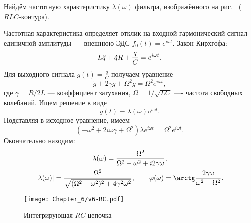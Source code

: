 \begin{lab:example}\label{example:RLC}
Найдём частотную характеристику $\lambda(\omega)$ фильтра,
изображённого на рис.~ ($RLC$-контура).

Частотная характеристика определяет отклик на входной гармонический сигнал
единичной амплитуды~--- внешнюю ЭДС $f_0(t)=e^{i\omega t}$.
Закон Кирхгофа:
\begin{equation}
    \eqmark{RLC}
L\ddot{q} + \dot{q}R+\frac{q}{C}=e^{i\omega t}.
\end{equation}
Для выходного сигнала $g(t)=\frac{q}{C}$ получаем уравнение
\begin{equation*}
\ddot{g}+2\gamma\dot{g}+\Omega^2g=\Omega^2 e^{i\omega t},
\end{equation*}
где $\gamma = R/2L$ --- коэффициент затухания,
$\Omega = 1/\sqrt{LC}$ ---- частота свободных колебаний.
Ищем решение в виде
\begin{equation*}
g(t)=\lambda(\omega)e^{i\omega t}.
\end{equation*}
Подставляя в исходное уравнение, имеем
\begin{equation*}
    (-\omega^2 +2i\omega\gamma + \Omega^2) \lambda e^{i\omega t}=\Omega^2 e^{i\omega t}.
\end{equation*}
Окончательно находим:
\begin{equation}
    \eqmark{RLC-lambda}
\begin{gathered}
\lambda(\omega)=\frac{\Omega^2}{\Omega^2-\omega^2+i2\gamma\omega},\\
\left|\lambda(\omega)\right|=\frac{\Omega^2}{\sqrt{
(\Omega^2-\omega^2)^2+4\gamma^2\omega^2}},
\qquad \varphi(\omega)=\arctg\frac{2\gamma\omega}{\omega^2-\Omega^2}.
\end{gathered}
\end{equation}
\end{lab:example}

\begin{wrapfigure}[11]{o}{0.25\textwidth}
\centering\texttt{[image: Chapter\_6/v6-RC.pdf]}
\caption{\footnotesize Интегрирующая $RC$-цепочка}
\end{wrapfigure}

